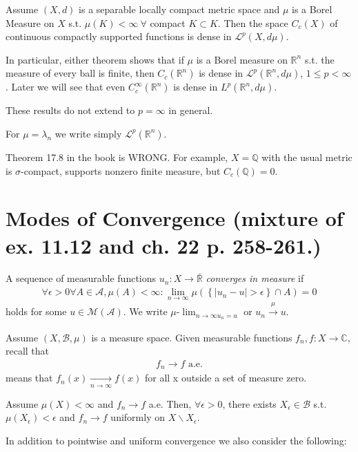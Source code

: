 \fi 
\begin{theorem}
    Assume \((X,d)\) is a separable locally compact metric space and \(\mu\) is a Borel Measure on \(X\) s.t. \(\mu(K)<\infty \ \forall \)
    compact \(K\subset K\). Then the space \(C_c(X)\) of continuous compactly supported functions is dense in \(\mathcal{L}^p(X,d\mu)\).
\end{theorem}

In particular, either theorem shows that if \(\mu\) is a Borel measure on \(\mathbb{R}^n\) s.t. the measure of every ball is finite, then 
\(C_c(\mathbb{R}^n)\) is dense in \(\mathcal{L}^p(\mathbb{R}^n, d\mu)\), \(1\leq p< \infty\). Later we will see that even 
\(C^{\infty}_{c}(\mathbb{R}^n)\) is dense in \(L^p(\mathbb{R}^n, d\mu)\).
\begin{remark}
    These results do not extend to \(p=\infty\) in general. 

    For \(\mu=\lambda_n\) we write simply \(\mathcal{L}^p(\mathbb{R}^n)\).
\end{remark}
\begin{remark}
    Theorem 17.8 in the book is WRONG. For example, \(X=\mathbb{Q}\) with the usual metric is \(\sigma\)-compact, supports nonzero finite measure,
    but \(C_c(\mathbb{Q})=0\).
\end{remark}

\section*{Modes of Convergence (mixture of ex. 11.12 and ch. 22 p. 258-261.)}
\ifdetailed
\begin{definition}
    A sequence of measurable functions \(u_n:X\rightarrow \bar{\mathbb{R}}\) \emph{converges in measure} if
    \begin{align*}
        \forall\epsilon>0\forall A\in\mathscr{A},\mu(A)<\infty:\lim\limits_{n\rightarrow\infty} 
        \mu\left(\left\{\vert u_n - u\vert > \epsilon\right\}\cap A\right) = 0
    \end{align*}
    holds for some \(u\in\mathcal{M}(\mathscr{A})\). We write \(\mu\)-\(\lim_{n\rightarrow\infty u_n = u}\) or 
    \(u_n\xrightarrow[ ]{\mu} u\).
\end{definition}
\fi
Assume \(\left(X,\mathscr{B},\mu\right)\) is a measure space. Given measurable functions \(f_n,f:X\rightarrow\mathbb{C}\), recall that
\begin{align*}
    f_n\rightarrow f \text{ a.e.}
\end{align*}
means that \(f_n(x)\xrightarrow[n\rightarrow\infty]{ } f(x)\) for all x outside a set of measure zero. 
\begin{theorem}[Egorov]
    Assume \(\mu(X)<\infty\) and \(f_n\rightarrow f\) a.e. Then, \(\forall\epsilon>0\), there exists \(X_{\epsilon} \in\mathscr{B}\)
    s.t. \(\mu(X_{\epsilon})<\epsilon\) and \(f_n\rightarrow f\) uniformly on \(X\backslash X_{\epsilon}\).
\end{theorem}
In addition to pointwise and uniform convergence we also consider the following: 

